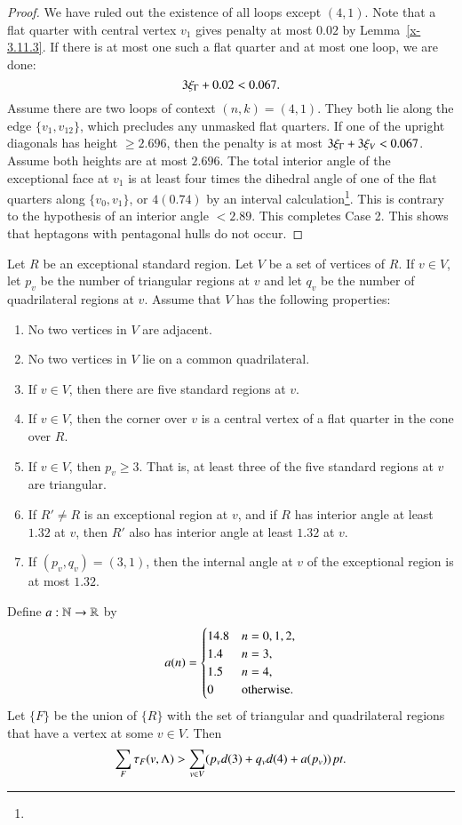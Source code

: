 \begin{proof}
We have ruled out the existence of all loops except $(4,1)$. Note
that a flat quarter with central vertex $v_1$ gives penalty at
most $0.02$ by Lemma~\ref{x-3.11.3}.
  If there is at most one
such a flat quarter and at most one loop, we are done:
$$3\xi_\Gamma + 0.02 < 0.067.$$
Assume there are two loops of context $(n,k)=(4,1)$.  They both
lie along the edge $\{v_1,v_{12}\}$, which precludes any unmasked
flat quarters. If one of the upright diagonals has height
$\ge2.696$, then the penalty is at most $3\xi_\Gamma+3\xi_V< 0.067$.
Assume both heights are at most $2.696$. The total interior angle
of the exceptional face at $v_1$ is at least four times the
dihedral angle of one of the flat quarters along $\{v_0,v_1\}$, or
$4(0.74)$ by an interval calculation\footnote{}. This is
contrary to the hypothesis of an interior angle $<2.89$.   This
completes Case 2. This shows that heptagons with pentagonal hulls
do not occur.
\end{proof}

\begin{lemma}\label{lemma:excess-1}
Let $R$ be an exceptional standard region.  Let $V$
be a set of vertices of $R$.  If $v\in V$, let $p_v$ be the number
of triangular regions at $v$ and let $q_v$ be the number of
quadrilateral regions at $v$.  Assume that $V$ has the following
properties:
    \begin{enumerate}
        \item No two
        vertices in $V$ are adjacent.
        \item No two vertices
        in $V$ lie on a common quadrilateral.
        \item If $v\in V$, then there are five standard regions at
        $v$.
        \item If $v\in V$, then the corner over $v$ is a central
        vertex of a flat quarter in the cone over $R$.
        \item If $v\in V$, then $p_v\ge 3$.  That is, at least
        three of the five standard regions at $v$ are triangular.
        \item If $R'\ne R$ is an exceptional region at $v$, and if $R$
        has interior angle at least $1.32$ at $v$, then $R'$ also has interior
        angle at least $1.32$ at $v$.
        \item If $(p_v,q_v)=(3,1)$, then the internal angle at $v$ of the exceptional
        region is at most $1.32$.
    \end{enumerate}
  Define $a:{\mathbb N}\to {\mathbb R}$ by
  $$a(n) = \begin{cases}
    14.8 &n=0,1,2,\\
    1.4 & n=3,\\
    1.5 & n=4,\\
    0 & \text{otherwise.}
  \end{cases}
  \index{aZ@$a(n)$}
  $$
Let $\{F\}$ be the union of $\{R\}$ with the set of triangular and
quadrilateral regions that have a vertex at some $v\in V$. Then
    $$\sum_F\tau_F(v,\Lambda) > \sum_{v\in V} (p_v d(3) + q_v d(4) + a
    (p_v))\,\hbox{\it pt}.$$
\end{lemma}

